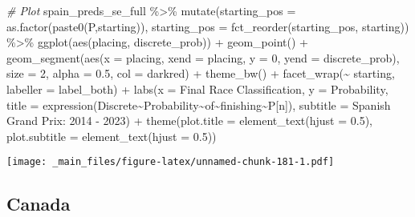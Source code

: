 \documentclass[
]{book}
\newenvironment{Shaded}{\begin{snugshade}}{\end{snugshade}}
\newcommand{\AttributeTok}[1]{\textcolor[rgb]{0.77,0.63,0.00}{#1}}
\newcommand{\CommentTok}[1]{\textcolor[rgb]{0.56,0.35,0.01}{\textit{#1}}}
\newcommand{\DecValTok}[1]{\textcolor[rgb]{0.00,0.00,0.81}{#1}}
\newcommand{\FloatTok}[1]{\textcolor[rgb]{0.00,0.00,0.81}{#1}}
\newcommand{\FunctionTok}[1]{\textcolor[rgb]{0.00,0.00,0.00}{#1}}
\newcommand{\NormalTok}[1]{#1}
\newcommand{\SpecialCharTok}[1]{\textcolor[rgb]{0.00,0.00,0.00}{#1}}
\newcommand{\StringTok}[1]{\textcolor[rgb]{0.31,0.60,0.02}{#1}}
\begin{document}
\begin{Shaded}
\begin{Highlighting}[]
\CommentTok{\# Plot}
\NormalTok{spain\_preds\_se\_full }\SpecialCharTok{\%\textgreater{}\%}
  \FunctionTok{mutate}\NormalTok{(}\AttributeTok{starting\_pos =} \FunctionTok{as.factor}\NormalTok{(}\FunctionTok{paste0}\NormalTok{(}\StringTok{\textquotesingle{}P\textquotesingle{}}\NormalTok{,starting)),}
         \AttributeTok{starting\_pos =} \FunctionTok{fct\_reorder}\NormalTok{(starting\_pos, starting)) }\SpecialCharTok{\%\textgreater{}\%}
  \FunctionTok{ggplot}\NormalTok{(}\FunctionTok{aes}\NormalTok{(placing, discrete\_prob)) }\SpecialCharTok{+}
  \FunctionTok{geom\_point}\NormalTok{() }\SpecialCharTok{+}
  \FunctionTok{geom\_segment}\NormalTok{(}\FunctionTok{aes}\NormalTok{(}\AttributeTok{x =}\NormalTok{ placing, }\AttributeTok{xend =}\NormalTok{ placing, }\AttributeTok{y =} \DecValTok{0}\NormalTok{, }\AttributeTok{yend =}\NormalTok{ discrete\_prob),}
               \AttributeTok{size =} \DecValTok{2}\NormalTok{, }\AttributeTok{alpha =} \FloatTok{0.5}\NormalTok{, }\AttributeTok{col =} \StringTok{\textquotesingle{}darkred\textquotesingle{}}\NormalTok{) }\SpecialCharTok{+}
  \FunctionTok{theme\_bw}\NormalTok{() }\SpecialCharTok{+}
  \FunctionTok{facet\_wrap}\NormalTok{(}\SpecialCharTok{\textasciitilde{}}\NormalTok{ starting, }\AttributeTok{labeller =}\NormalTok{ label\_both) }\SpecialCharTok{+}
  \FunctionTok{labs}\NormalTok{(}\AttributeTok{x =} \StringTok{\textquotesingle{}Final Race Classification\textquotesingle{}}\NormalTok{,}
       \AttributeTok{y =} \StringTok{\textquotesingle{}Probability\textquotesingle{}}\NormalTok{,}
       \AttributeTok{title =} \FunctionTok{expression}\NormalTok{(Discrete}\SpecialCharTok{\textasciitilde{}}\NormalTok{Probability}\SpecialCharTok{\textasciitilde{}}\NormalTok{of}\SpecialCharTok{\textasciitilde{}}\NormalTok{finishing}\SpecialCharTok{\textasciitilde{}}\NormalTok{P[n]),}
       \AttributeTok{subtitle =} \StringTok{\textquotesingle{}Spanish Grand Prix: 2014 {-} 2023\textquotesingle{}}\NormalTok{) }\SpecialCharTok{+}
  \FunctionTok{theme}\NormalTok{(}\AttributeTok{plot.title =} \FunctionTok{element\_text}\NormalTok{(}\AttributeTok{hjust =} \FloatTok{0.5}\NormalTok{),}
        \AttributeTok{plot.subtitle =} \FunctionTok{element\_text}\NormalTok{(}\AttributeTok{hjust =} \FloatTok{0.5}\NormalTok{)) }
\end{Highlighting}
\end{Shaded}

\texttt{[image: \_main\_files/figure-latex/unnamed-chunk-181-1.pdf]}

\hypertarget{canada}{%
\subsection{Canada}\label{canada}}
\end{document}
